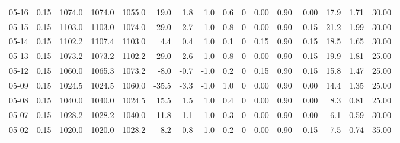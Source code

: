 \begin{threeparttable}
{\begin{tabular}{lrrrrrrrrrrrrrrr}
  05-16 &     0.15 & 1074.0 & 1074.0 & 1055.0 &       19.0 &            1.8 &                      1.0 &                 0.6 &              0 &       0.00 &      0.90 &           0.00 &             17.9 &            1.71 &                  30.00 \\
  05-15 &     0.15 & 1103.0 & 1103.0 & 1074.0 &       29.0 &            2.7 &                      1.0 &                 0.8 &              0 &       0.00 &      0.90 &          -0.15 &             21.2 &            1.99 &                  30.00 \\
  05-14 &     0.15 & 1102.2 & 1107.4 & 1103.0 &        4.4 &            0.4 &                      1.0 &                 0.1 &              0 &       0.15 &      0.90 &           0.15 &             18.5 &            1.65 &                  30.00 \\
  05-13 &     0.15 & 1073.2 & 1073.2 & 1102.2 &      -29.0 &           -2.6 &                     -1.0 &                 0.8 &              0 &       0.00 &      0.90 &          -0.15 &             19.9 &            1.81 &                  25.00 \\
  05-12 &     0.15 & 1060.0 & 1065.3 & 1073.2 &       -8.0 &           -0.7 &                     -1.0 &                 0.2 &              0 &       0.15 &      0.90 &           0.15 &             15.8 &            1.47 &                  25.00 \\
  05-09 &     0.15 & 1024.5 & 1024.5 & 1060.0 &      -35.5 &           -3.3 &                     -1.0 &                 1.0 &              0 &       0.00 &      0.90 &           0.00 &             14.4 &            1.35 &                  25.00 \\
  05-08 &     0.15 & 1040.0 & 1040.0 & 1024.5 &       15.5 &            1.5 &                      1.0 &                 0.4 &              0 &       0.00 &      0.90 &           0.00 &              8.3 &            0.81 &                  25.00 \\
  05-07 &     0.15 & 1028.2 & 1028.2 & 1040.0 &      -11.8 &           -1.1 &                     -1.0 &                 0.3 &              0 &       0.00 &      0.90 &           0.00 &              6.1 &            0.59 &                  30.00 \\
  05-02 &     0.15 & 1020.0 & 1020.0 & 1028.2 &       -8.2 &           -0.8 &                     -1.0 &                 0.2 &              0 &       0.00 &      0.90 &          -0.15 &              7.5 &            0.74 &                  35.00 \\

\end{tabular}}
\end{threeparttable}
